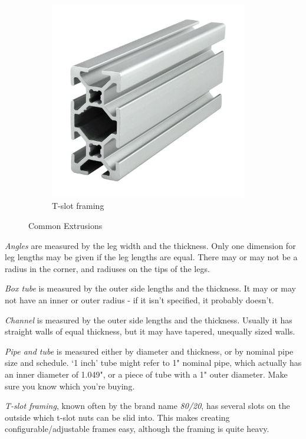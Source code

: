 \begin{figure}[H]
\begin{subfigure}[b]{.19\linewidth}
		\includegraphics[width=0.95\textwidth]{imgs/extrusion_8020.jpeg}
		\caption{T-slot framing}
	\end{subfigure}	
	\caption{Common Extrusions}
\end{figure}

 \begin{asparaenum}[a)]
 	\item \textit{Angles} are measured by the leg width and the thickness. Only one dimension for leg lengths may be given if the leg lengths are equal. There may or may not be a radius in the corner, and radiuses on the tips of the legs.
 	\item \textit{Box tube} is measured by the outer side lengths and the thickness. It may or may not have an inner or outer radius - if it isn't specified, it probably doesn't.
 	\item \textit{Channel} is measured by the outer side lengths and the thickness. Usually it has straight walls of equal thickness, but it may have tapered, unequally sized walls.
 	\item \textit{Pipe and tube} is measured either by diameter and thickness, or by nominal pipe size and schedule. `1 inch' tube might refer to 1" nominal pipe, which actually has an inner diameter of 1.049", or a piece of tube with a 1" outer diameter. Make sure you know which you're buying.
 	\item \textit{T-slot framing}, known often by the brand name \textit{80/20}, has several slots on the outside which t-slot nuts can be slid into. This makes creating configurable/adjustable frames easy, although the framing is quite heavy. 
 \end{asparaenum}
 
